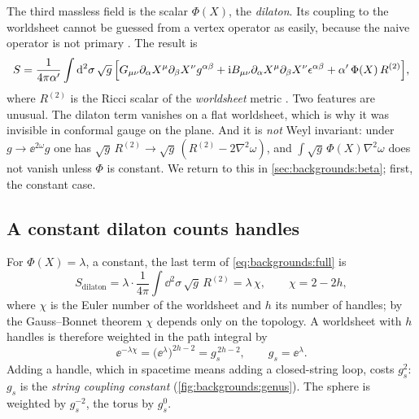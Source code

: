 The third massless field is the scalar $\Phi(X)$, the \emph{dilaton}. Its
coupling to the worldsheet cannot be guessed from a vertex operator as easily, because the
naive operator is not primary . The result is
\begin{equation}\label{eq:backgrounds:full}
  S=\frac{1}{4\pi\alpha'}\int\mathrm{d}^2\sigma\,\sqrt g\,\Bigl[G_{\mu\nu}
  \partial_\alpha X^\mu\partial_\beta X^\nu g^{\alpha\beta}
  +\mathrm{i} B_{\mu\nu}\partial_\alpha X^\mu\partial_\beta X^\nu\epsilon^{\alpha\beta}
  +\alpha'\,\Phi(X)\,R^{(2)}\Bigr],
\end{equation}
where $R^{(2)}$ is the Ricci scalar of the \emph{worldsheet} metric
. Two features are
unusual. The dilaton term vanishes on a flat worldsheet, which is why it was invisible in
conformal gauge on the plane. And it is \emph{not} Weyl invariant: under
$g\to\ee^{2\omega}g$ one has $\sqrt g\,R^{(2)}\to\sqrt g\,(R^{(2)}-2\nabla^2\omega)$, and
$\int\sqrt g\,\Phi(X)\nabla^2\omega$ does not vanish unless $\Phi$ is constant. We return to
this in \cref{sec:backgrounds:beta}; first, the constant case.

\subsection{A constant dilaton counts handles}

For $\Phi(X)=\lambda$, a constant, the last term of \eqref{eq:backgrounds:full} is
\begin{equation}\label{eq:backgrounds:euler}
  S_{\mathrm{dilaton}}=\lambda\cdot\frac{1}{4\pi}\int\dd^2\sigma\,\sqrt g\,R^{(2)}=\lambda\,\chi,
  \qquad \chi=2-2h,
\end{equation}
where $\chi$ is the Euler number of the worldsheet and $h$ its number of handles; by the
Gauss--Bonnet theorem $\chi$ depends only on the topology.
A worldsheet with $h$ handles is therefore weighted in the path integral by
\begin{equation}\label{eq:backgrounds:genus}
  \ee^{-\lambda\chi}=\bigl(\ee^{\lambda}\bigr)^{2h-2}=g_s^{\,2h-2},\qquad g_s=\ee^{\lambda}.
\end{equation}
Adding a handle, which in spacetime means adding a closed-string loop, costs $g_s^2$:
$g_s$ is the \emph{string coupling constant}
(\cref{fig:backgrounds:genus}). The sphere is weighted by $g_s^{-2}$, the torus by $g_s^0$.

